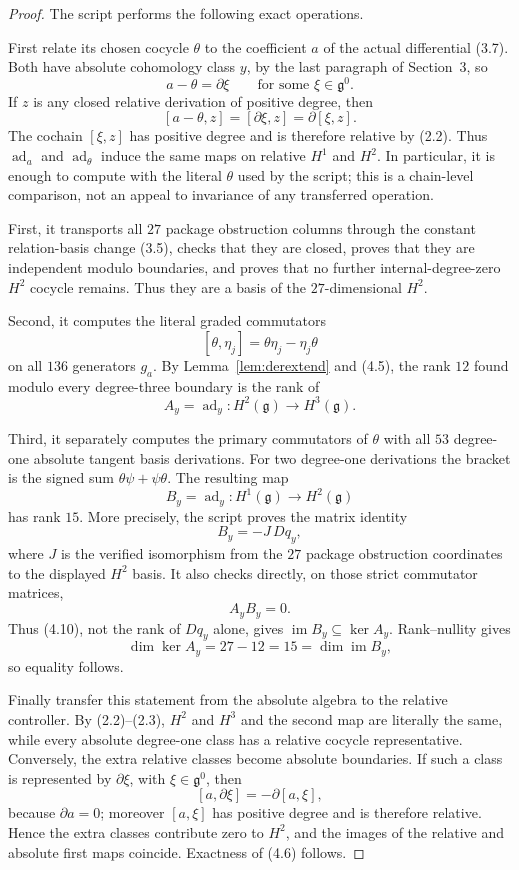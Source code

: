\documentclass[11pt]{article}
\theoremstyle{definition}
\theoremstyle{remark}
\newcommand{\im}{\operatorname{im}}
\newcommand{\ad}{\operatorname{ad}}
\begin{document}
\begin{proof}
The script  performs the
following exact operations.

First relate its chosen cocycle $\theta$ to the coefficient $a$ of the
actual differential (3.7).  Both have absolute cohomology class $y$, by the
last paragraph of Section~3, so
\[
 a-\theta=\partial\xi\qquad\text{for some }\xi\in\mathfrak g^0.
 \tag{4.7}
\]
If $z$ is any closed relative derivation of positive degree, then
\[
 [a-\theta,z]=[\partial\xi,z]=\partial[\xi,z].              \tag{4.8}
\]
The cochain $[\xi,z]$ has positive degree and is therefore relative by
(2.2).  Thus $\ad_a$ and $\ad_\theta$ induce the same maps on relative
$H^1$ and $H^2$.  In particular, it is enough to compute with the literal
$\theta$ used by the script; this is a chain-level comparison, not an appeal
to invariance of any transferred operation.

First, it transports all $27$ package obstruction columns through the
constant relation-basis change (3.5), checks that they are closed, proves
that they are independent modulo boundaries, and proves that no further
internal-degree-zero $H^2$ cocycle remains.  Thus they are a basis of the
$27$-dimensional $H^2$.

Second, it computes the literal graded commutators
\[
 [\theta,\eta_j]=\theta\eta_j-\eta_j\theta
\]
on all $136$ generators $g_a$.  By Lemma~\ref{lem:derextend} and (4.5), the
rank $12$ found modulo every degree-three boundary is the rank of
\[
 A_y=\ad_y:H^2(\mathfrak g)\longrightarrow H^3(\mathfrak g).
\]

Third, it separately computes the primary commutators of $\theta$ with all
$53$ degree-one absolute tangent basis derivations.  For two degree-one
derivations the bracket is the signed sum
$\theta\psi+\psi\theta$.  The resulting map
\[
 B_y=\ad_y:H^1(\mathfrak g)\longrightarrow H^2(\mathfrak g)
\]
has rank $15$.  More precisely, the script proves the matrix identity
\[
 B_y=-J\,Dq_y,                                                \tag{4.9}
\]
where $J$ is the verified isomorphism from the $27$ package obstruction
coordinates to the displayed $H^2$ basis.  It also checks directly, on those
strict commutator matrices,
\[
 A_yB_y=0.                                                    \tag{4.10}
\]
Thus (4.10), not the rank of $Dq_y$ alone, gives
$\im B_y\subseteq\ker A_y$.  Rank--nullity gives
\[
 \dim\ker A_y=27-12=15=\dim\im B_y,
\]
so equality follows.

Finally transfer this statement from the absolute algebra to the relative
controller.  By (2.2)--(2.3), $H^2$ and $H^3$ and the second map are literally
the same, while every absolute degree-one class has a relative cocycle
representative.  Conversely, the extra relative classes become absolute
boundaries.  If such a class is represented by $\partial\xi$, with
$\xi\in\mathfrak g^0$, then
\[
 [a,\partial\xi]=-\partial[a,\xi],                            \tag{4.11}
\]
because $\partial a=0$; moreover $[a,\xi]$ has positive degree and is
therefore relative.  Hence the extra classes contribute zero to $H^2$, and
the images of the relative and absolute first maps coincide.  Exactness of
(4.6) follows.
\end{proof}
\end{document}

